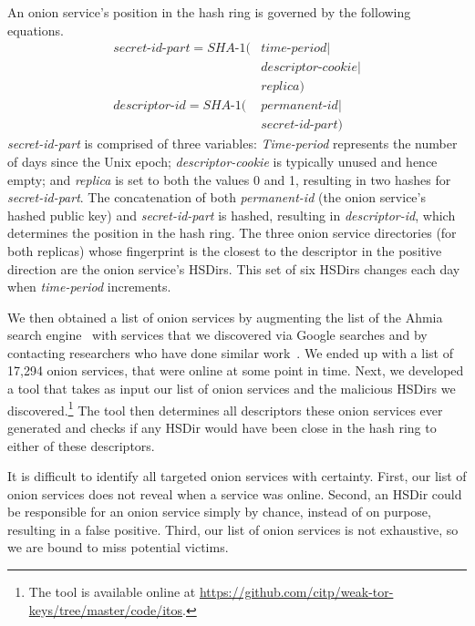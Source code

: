 An onion service's position in the hash ring is governed by
the following equations.
\begin{equation}
\begin{split}
\textit{secret-id-part} = \textit{SHA-1}(& \textit{time-period} \mid \\
                                         & \textit{descriptor-cookie} \mid \\
                                         & \textit{replica}) \\
\textit{descriptor-id} =  \textit{SHA-1}(& \textit{permanent-id} \mid \\
                                         & \textit{secret-id-part})
\end{split}
\end{equation}
\textit{secret-id-part} is comprised of three variables:  \textit{Time-period}
represents the number of days since the Unix epoch; \textit{descriptor-cookie}
is typically unused and hence empty; and \textit{replica} is set to both the
values 0 and 1, resulting in two hashes for \textit{secret-id-part}.  
The concatenation of both \textit{permanent-id} (the onion service's hashed
public key) and \textit{secret-id-part} is hashed, resulting in
\textit{descriptor-id}, which determines the position in the hash ring.  The
three onion service directories (for both replicas) whose fingerprint is the
closest to the descriptor in the positive direction are the onion service's HSDirs.
This set of six HSDirs changes each day when \textit{time-period} increments.

We then obtained a list of onion services by augmenting the list of the Ahmia
search engine~\cite{ahmia} with services that we discovered via Google searches
and by contacting researchers who have done similar work~\cite{Matic2015a}.  We
ended up with a list of 17,294 onion services, that were online at some point in
time.  Next, we developed a tool that takes as input our list of onion services
and the malicious HSDirs we discovered.\footnote{The tool is available online at
\url{https://github.com/citp/weak-tor-keys/tree/master/code/itos}.}  The tool
then determines all descriptors these onion services ever generated and checks
if any HSDir would have been close in the hash ring to either of these
descriptors.

It is difficult to identify all targeted onion services with
certainty.  First, our list of onion services does not reveal when a service was
online.  Second, an HSDir could be responsible for an onion service simply by
chance, instead of on purpose, resulting in a false positive.  Third, our list
of onion services is not exhaustive, so we are bound to miss potential victims.

